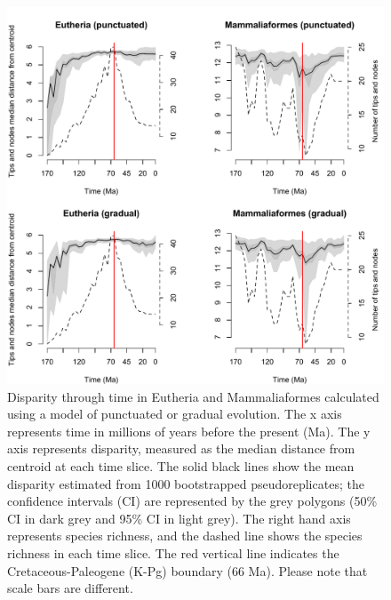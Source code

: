 \documentclass[12pt,letterpaper]{article}
\begin{document}
\begin{figure}[!htbp]
\centering
    \includegraphics[keepaspectratio=true]{Figures/Main_results.pdf}
\caption{Disparity through time in Eutheria and Mammaliaformes calculated using a model of punctuated or gradual evolution. The x axis represents time in millions of years before the present (Ma). The y axis represents disparity, measured as the median distance from centroid at each time slice. %
 The solid black lines show the mean disparity estimated from 1000 bootstrapped pseudoreplicates; the confidence intervals (CI) are represented by the grey polygons (50\% CI in dark grey and 95\% CI in light grey). The right hand axis represents species richness, and the dashed line shows the species richness in each time slice. The red vertical line indicates the Cretaceous-Paleogene (K-Pg) boundary (66 Ma).
 Please note that scale bars are different.}
\label{fig:Fig_Raw_results}
\end{figure}
\end{document}
